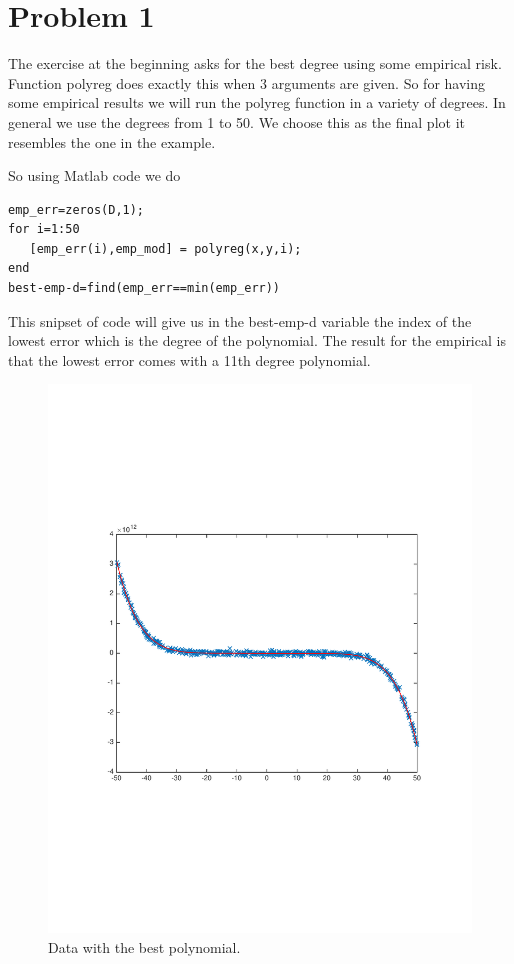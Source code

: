 \section{Problem 1}

The exercise at the beginning asks for the best degree using some empirical risk.
Function polyreg does exactly this when 3 arguments are given.
So for having some empirical results we will run the polyreg function
in a variety of degrees. In general we use the degrees from 1 to 50.
We choose this as the final plot it resembles the one in the example.

So using Matlab code we do
\begin{verbatim}
emp_err=zeros(D,1);
for i=1:50
   [emp_err(i),emp_mod] = polyreg(x,y,i);
end
best-emp-d=find(emp_err==min(emp_err))
\end{verbatim}

This snipset of code will give us in the best-emp-d variable the 
index of the lowest error which is the degree of the polynomial.
The result for the empirical is that the lowest error comes with
a 11th degree polynomial.

\begin{figure}[!h]
{
    \includegraphics[width=\columnwidth]
    {figures/bestpolu}
    \caption{\footnotesize{\bf} Data with the best polynomial.}
    \label{fig:f}
}
\end{figure}

